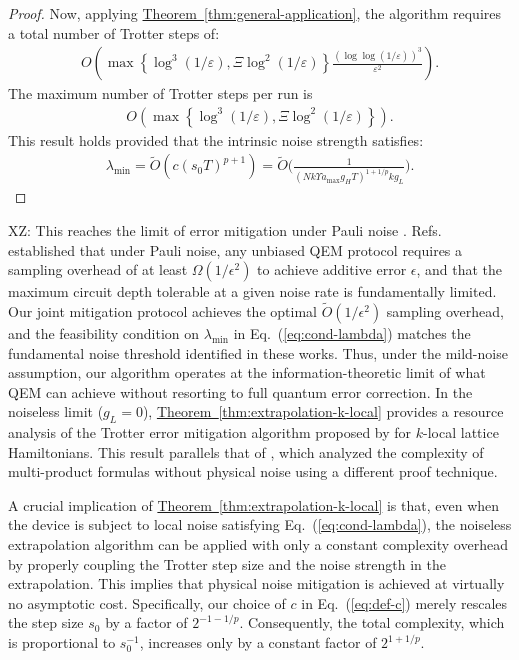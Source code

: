 \documentclass[11pt]{article}
\newcommand{\eq}[1]{(\ref{eq:#1})}
\newcommand{\thm}[1]{\hyperref[thm:#1]{Theorem~\ref*{thm:#1}}}
\newcommand{\eps}{\varepsilon}
\newcommand{\xz}[1]{{\color{cyan} XZ: #1}}
\begin{document}
\begin{proof}
    Now, applying \thm{general-application}, the algorithm requires a total number of Trotter steps of:
    \begin{align*}
         O\left( \max\left\{\log^3(1/\eps), \Xi \log^2(1/\eps)\right\} \frac{(\log\log (1/\eps))^3}{\eps^2} \right).
    \end{align*}
    The maximum number of Trotter steps per run is
    \begin{align*}
  O\left( \max\left\{\log^3(1/\eps), \Xi \log^2(1/\eps)\right\} \right).
    \end{align*}
    This result holds provided that the intrinsic noise strength satisfies:
    \begin{align*}
        \lambda_{\min} = \widetilde{O}(c(s_0T)^{p+1}) = \widetilde{O}\Big(\frac{1}{ (Nk\Upsilon a_{\max}g_HT)^{1+1/p} kg_L }\Big).
    \end{align*}
\end{proof}
\xz{This reaches the limit of error mitigation under Pauli noise \cite{wang2021noise, cai2021multi}.}
Refs.~\cite{wang2021noise, cai2021multi} established that under Pauli noise, any unbiased QEM protocol requires a sampling overhead of at least $\Omega(1/\epsilon^2)$ to achieve additive error $\epsilon$, and that the maximum circuit depth tolerable at a given noise rate is fundamentally limited. Our joint mitigation protocol achieves the optimal $\widetilde{O}(1/\epsilon^2)$ sampling overhead, and the feasibility condition on $\lambda_{\min}$ in Eq.~(\ref{eq:cond-lambda}) matches the fundamental noise threshold identified in these works. Thus, under the mild-noise assumption, our algorithm operates at the information-theoretic limit of what QEM can achieve without resorting to full quantum error correction.
In the noiseless limit ($g_L = 0$), \thm{extrapolation-k-local} provides a resource analysis of the Trotter error mitigation algorithm proposed by \citet{watson2025exponentially} for $k$-local lattice Hamiltonians. This result parallels that of \citet{mizuta2025commutator}, which analyzed the complexity of multi-product formulas without physical noise using a different proof technique.

A crucial implication of \thm{extrapolation-k-local} is that, even when the device is subject to local noise satisfying Eq.~\eq{cond-lambda}, the noiseless extrapolation algorithm can be applied with only a constant complexity overhead by properly coupling the Trotter step size and the noise strength in the extrapolation. This implies that physical noise mitigation is achieved at virtually no asymptotic cost. Specifically, our choice of $c$ in Eq.~\eq{def-c} merely rescales the step size $s_0$ by a factor of $2^{-1-1/p}$. Consequently, the total complexity, which is proportional to $s_0^{-1}$, increases only by a constant factor of $2^{1+1/p}$.
\end{document}

